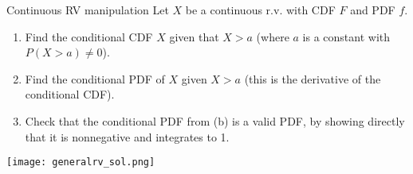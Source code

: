 \documentclass[11.5pt]{article}
\begin{document}


\begin{exercise}{Continuous RV manipulation}
Let $X$ be a continuous r.v. with CDF $F$ and PDF $f$.
\begin{enumerate}
    \item Find the conditional CDF $X$ given that $X>a$ (where $a$ is a constant with $P(X>a)\neq0$).
    \item Find the conditional PDF of $X$ given $X > a$ (this is the derivative of the conditional CDF).
    \item Check that the conditional PDF from (b) is a valid PDF, by showing directly that it is nonnegative and integrates to 1.
\end{enumerate}
\end{exercise}
\begin{solution}{2}
\texttt{[image: generalrv\_sol.png]}
\end{solution}


\end{document}
